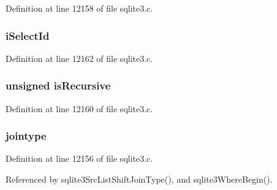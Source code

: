 Definition at line 12158 of file sqlite3.\+c.

\hypertarget{struct_src_list_1_1_src_list__item_ae1e7b6e354cb7e8a3a6e74a306f14532}{}
\subsubsection[{i\+Select\+Id}]{ i\+Select\+Id}\label{struct_src_list_1_1_src_list__item_ae1e7b6e354cb7e8a3a6e74a306f14532}


Definition at line 12162 of file sqlite3.\+c.

\hypertarget{struct_src_list_1_1_src_list__item_a135424029850e97c5f5cad707182f47d}{}
\subsubsection[{is\+Recursive}]{\setlength{\rightskip}{0pt plus 5cm}unsigned is\+Recursive}\label{struct_src_list_1_1_src_list__item_a135424029850e97c5f5cad707182f47d}


Definition at line 12160 of file sqlite3.\+c.

\hypertarget{struct_src_list_1_1_src_list__item_aff0cce403d435da475dee508e333353b}{}
\subsubsection[{jointype}]{ jointype}\label{struct_src_list_1_1_src_list__item_aff0cce403d435da475dee508e333353b}


Definition at line 12156 of file sqlite3.\+c.



Referenced by sqlite3\+Src\+List\+Shift\+Join\+Type(), and sqlite3\+Where\+Begin().

\hypertarget{struct_src_list_1_1_src_list__item_a26908f376e50467dcb8365eb7a75c0f4}{}
